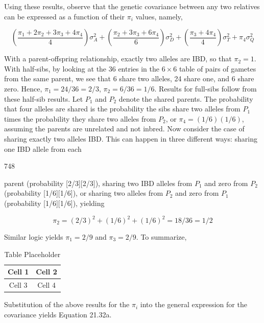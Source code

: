 \documentclass{article}
\begin{document}
Using these results, observe that the genetic covariance between any two relatives can be expressed as a function of their  $ \pi_{i} $ values, namely,

\begin{equation}
\left(\frac{\pi_{1}+2\pi_{2}+3\pi_{3}+4\pi_{4}}{4}\right)\sigma_{A}^{2}+\left(\frac{\pi_{2}+3\pi_{3}+6\pi_{4}}{6}\right)\sigma_{D}^{2}+\left(\frac{\pi_{3}+4\pi_{4}}{4}\right)\sigma_{T}^{2}+\pi_{4}\sigma_{Q}^{2}
\tag{21.34c}
\label{eq:21_34c}
\end{equation}

With a parent-offspring relationship, exactly two alleles are IBD, so that  $ \pi_{2} = 1 $. With half-sibs, by looking at the 36 entries in the  $ 6 \times 6 $ table of pairs of gametes from the same parent, we see that 6 share two alleles, 24 share one, and 6 share zero. Hence,  $ \pi_{1} = 24/36 = 2/3 $,  $ \pi_{2} = 6/36 = 1/6 $. Results for full-sibs follow from these half-sib results. Let  $ P_{1} $ and  $ P_{2} $ denote the shared parents. The probability that four alleles are shared is the probability the sibs share two alleles from  $ P_{1} $ times the probability they share two alleles from  $ P_{2} $, or  $ \pi_{4} = (1/6)(1/6) $, assuming the parents are unrelated and not inbred. Now consider the case of sharing exactly two alleles IBD. This can happen in three different ways: sharing one IBD allele from each

748

parent (probability [2/3][2/3]), sharing two IBD alleles from  $ P_{1} $ and zero from  $ P_{2} $ (probability [1/6][1/6]), or sharing two alleles from  $ P_{2} $ and zero from  $ P_{1} $ (probability [1/6][1/6]), yielding

\begin{equation}
\pi_{2}=\left(2/3\right)^{2}+\left(1/6\right)^{2}+\left(1/6\right)^{2}=18/36=1/2
\end{equation}

Similar logic yields  $ \pi_{1}=2/9 $ and  $ \pi_{3}=2/9 $. To summarize,

\begin{table}[h]
\centering
\begin{tabular}{|c|c|}
\hline
Cell 1 & Cell 2 \\
\hline
Cell 3 & Cell 4 \\
\hline
\end{tabular}
\caption{Table Placeholder}
\end{table}

Substitution of the above results for the  $ \pi_{i} $ into the general expression for the covariance yields Equation 21.32a.
\end{document}
